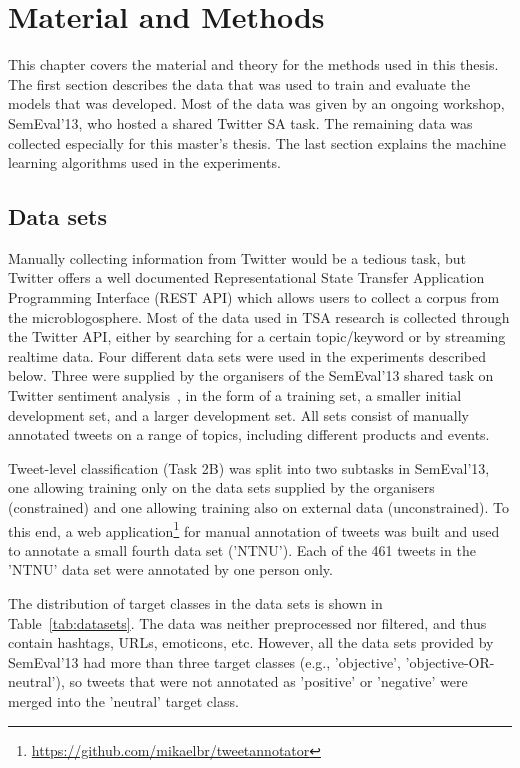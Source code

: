 \chapter{Material and Methods}
This chapter covers the material and theory for the methods used in this thesis. The first section describes the data that was used to train and evaluate the models that was developed. Most of the data was given by an ongoing workshop, SemEval'13, who hosted a shared Twitter SA task. The remaining data was collected especially for this master's thesis. The last section explains the machine learning algorithms used in the experiments.

\section{Data sets}
Manually collecting information from Twitter would be a tedious task, but Twitter offers a well documented Representational State Transfer Application Programming Interface (REST API) which allows users to collect a corpus from the microblogosphere. Most of the data used in TSA research is collected through the Twitter API, either by searching for a certain topic/keyword or by streaming realtime data. Four different data sets were used in the experiments described below. Three were supplied by the organisers of the SemEval'13 shared task on Twitter sentiment analysis~\citep{WilsonEA:13}, in the form of a training set, a smaller initial development set, and a larger development set. All sets consist of manually annotated tweets on a range of topics, including different products and events.

Tweet-level classification (Task 2B) was split into two subtasks in SemEval'13, one allowing training only on the data sets supplied by the organisers (constrained) and one allowing training also on external data (unconstrained). To this end, a web application\footnote{\url{https://github.com/mikaelbr/tweetannotator}} for manual annotation of tweets was built and used to annotate a small fourth data set ('NTNU'). Each of the 461 tweets in the 'NTNU' data set were annotated by one person only.

The distribution of target classes in the data sets is shown in Table~\ref{tab:datasets}. The data was neither preprocessed nor filtered, and thus contain hashtags, URLs, emoticons, etc. However, all the data sets provided by SemEval'13 had more than three target classes (e.g., 'objective', 'objective-OR-neutral'), so tweets that were not annotated as 'positive' or 'negative' were merged into the 'neutral' target class.

